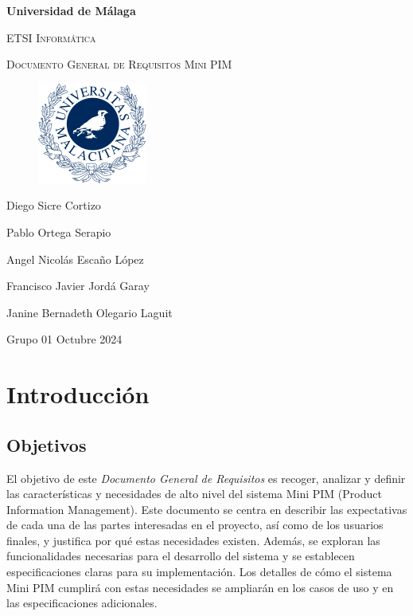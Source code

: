 \documentclass[12pt.a4paper]{article}
\begin{document}
\begin{titlepage}
\centering
{\bfseries\LARGE Universidad de Málaga\par}
\vspace{1cm}
{\scshape\Large ETSI Informática\par}
\vspace{2cm}
{\scshape\Huge Documento General de Requisitos Mini PIM}
\vspace{2cm}
\begin{figure}[H]
    \centering
     \includegraphics[width=0.25\linewidth]{umaLogo.png}
\end{figure}
\vfill
{\Large Diego Sicre Cortizo\par}
{\Large Pablo Ortega Serapio\par}
{\Large Angel Nicolás Escaño López\par}
{\Large Francisco Javier Jordá Garay\par}
{\Large Janine Bernadeth Olegario Laguit\par}
\vspace{1cm}
{\Large Grupo 01}
\vfill
{\Large Octubre 2024}

\end{titlepage}

\thispagestyle{empty} %
\tableofcontents


\newpage
\setcounter{page}{1}
\section{Introducción}

\subsection{Objetivos}

El objetivo de este \textit{Documento General de Requisitos} es recoger, analizar y definir las características y necesidades de alto nivel del sistema Mini PIM (Product Information Management). Este documento se centra en describir las expectativas de cada una de las partes interesadas en el proyecto, así como de los usuarios finales, y justifica por qué estas necesidades existen. Además, se exploran las funcionalidades necesarias para el desarrollo del sistema y se establecen especificaciones claras para su implementación. Los detalles de cómo el sistema Mini PIM cumplirá con estas necesidades se ampliarán en los casos de uso y en las especificaciones adicionales.
\end{document}
